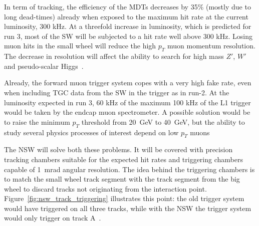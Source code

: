 In term of tracking, the efficiency of the MDTs decreases by 35\% (mostly due to long dead-times) already when exposed to the maximum hit rate at the current luminosity, 300 kHz.
At a threefold increase in luminosity, which is predicted for run 3, most of the SW will be subjected to a hit rate well above 300 kHz. Losing muon hits in the small wheel will reduce the high $p_T$ muon momentum resolution. The decrease in resolution will affect the ability to search for high mass $Z'$, $W'$ and pseudo-scalar Higgs~\cite{nsw_tdr}.

Already, the forward muon trigger system copes with a very high fake rate, even when including TGC data from the SW in the trigger as in run-2. At the luminosity expected in run 3, 60 kHz of the maximum 100 kHz of the L1 trigger would be taken by the endcap muon spectrometer. A possible solution would be to raise the minimum $p_T$ threshold from \SI{20}{\giga\electronvolt} to \SI{40}{\giga\electronvolt}, but the ability to study several physics processes of interest depend on low $p_T$ muons~\cite{nsw_tdr}

The NSW will solve both these problems. It will be covered with precision tracking chambers suitable for the expected hit rates and triggering chambers capable of \SI{1}{mrad} angular resolution. The idea behind the triggering chambers is to match the small wheel track segment with the track segment from the big wheel to discard tracks not originating from the interaction point. Figure~\ref{fig:nsw_track_triggering} illustrates this point: the old trigger system would have triggered on all three tracks, while with the NSW the trigger system would only trigger on track A~\cite{nsw_tdr}.


